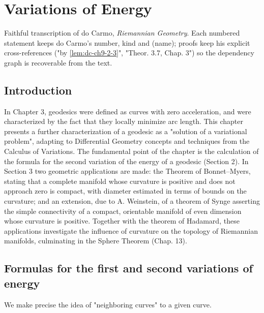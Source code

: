 \chapter{Variations of Energy}
\label{chap:dc-variations-of-energy}

Faithful transcription of do Carmo, \emph{Riemannian Geometry}. Each numbered
statement keeps do Carmo's number, kind and (name); proofs keep his explicit
cross-references ("by \cref{lem:dc-ch9-2-3}", "Theor. 3.7, Chap. 3") so the dependency graph
is recoverable from the text.

\section{Introduction}

In Chapter 3, geodesics were defined as curves with zero acceleration, and were
characterized by the fact that they locally minimize arc length. This chapter
presents a further characterization of a geodesic as a "solution of a variational
problem", adapting to Differential Geometry concepts and techniques from the
Calculus of Variations. The fundamental point of the chapter is the calculation
of the formula for the second variation of the energy of a geodesic (Section 2).
In Section 3 two geometric applications are made: the Theorem of Bonnet–Myers,
stating that a complete manifold whose curvature is positive and does not approach
zero is compact, with diameter estimated in terms of bounds on the curvature; and
an extension, due to A. Weinstein, of a theorem of Synge asserting the simple
connectivity of a compact, orientable manifold of even dimension whose curvature
is positive. Together with the theorem of Hadamard, these applications investigate
the influence of curvature on the topology of Riemannian manifolds, culminating in
the Sphere Theorem (Chap. 13).

\section{Formulas for the first and second variations of energy}

We make precise the idea of "neighboring curves" to a given curve.

